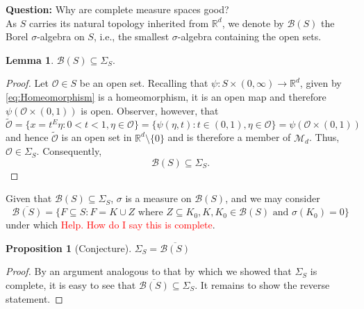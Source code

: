 \documentclass{article}
\theoremstyle{theorem}
\newtheorem{lemma}[theorem]{Lemma}
\newtheorem{proposition}[theorem]{Proposition}
\theoremstyle{remark}
\begin{document}
\textbf{Question:} Why are complete measure spaces good?\\





As $S$ carries its natural topology inherited from $\mathbb{R}^d$, we denote by $\mathcal{B}(S)$ the Borel $\sigma$-algebra on $S$, i.e., the smallest $\sigma$-algebra containing the open sets. 



\begin{lemma}    
$
\mathcal{B}(S)\subseteq \Sigma_S.
$
\end{lemma}
\begin{proof}
Let $\mathcal{O}\in S$ be an open set. Recalling that $\psi:S\times (0,\infty)\to\mathbb{R}^d$, given by \eqref{eq:Homeomorphism} is a homeomorphism, it is an open map and therefore $\psi(\mathcal{O}\times (0,1))$ is open. Observer, however, that
\begin{equation*}
\widetilde{\mathcal{O}}=\{x=t^E\eta:0<t<1,\eta\in\mathcal{O}\}=\{\psi(\eta,t):t\in(0,1),\eta\in\mathcal{O}\}=\psi(\mathcal{O}\times(0,1))
\end{equation*}
and hence $\widetilde{\mathcal{O}}$ is an open set in $\mathbb{R}^d \setminus \{0\}$ and is therefore a member of $\mathcal{M}_d$. Thus, $\mathcal{O} \in  \Sigma_S$. Consequently,
\begin{equation*}
\mathcal{B}(S)\subseteq\Sigma_S.
\end{equation*}
\end{proof}

Given that $\mathcal{B}(S)\subseteq \Sigma_S$, $\sigma$ is a measure on $\mathcal{B}(S)$, and we may consider 
\begin{equation*}
\overline{\mathcal{B}(S)}=\{F\subseteq S: F=K\cup Z\mbox{ where } Z\subseteq K_0, K,K_0\in\mathcal{B}(S)\mbox{ and }\sigma(K_0)=0\}
\end{equation*}
under which \textcolor{red}{Help. How do I say this is complete}. 





\begin{proposition}[Conjecture] 
$\Sigma_S=\overline{\mathcal{B}(S)}$
\end{proposition}
\begin{proof}
By an argument analogous to that by which we showed that $\Sigma_S$ is complete, it is easy to see that $\overline{\mathcal{B}(S)}\subseteq \Sigma_S$. It remains to show the reverse statement.
\end{proof}
\end{document}
